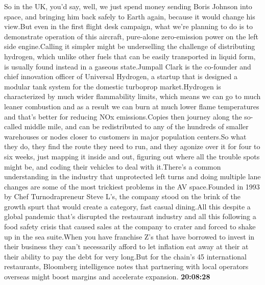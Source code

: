 \documentclass{article}%
\begin{document}
So in the UK, you'd say, well, we just spend money sending Boris Johnson into space, and bringing him back safely to Earth again, because it would change his view.But even in the first flight desk campaign, what we're planning to do is to demonstrate operation of this aircraft, pure{-}alone zero{-}emission power on the left side engine.Calling it simpler might be underselling the challenge of distributing hydrogen, which unlike other fuels that can be easily transported in liquid form, is usually found instead in a gaseous state.Jumpall Clark is the co{-}founder and chief innovation officer of Universal Hydrogen, a startup that is designed a modular tank system for the domestic turboprop market.Hydrogen is characterized by much wider flammability limits, which means we can go to much leaner combustion and as a result we can burn at much lower flame temperatures and that's better for reducing NOx emissions.Copies then journey along the so{-}called middle mile, and can be redistributed to any of the hundreds of smaller warehouses or nodes closer to customers in major population centers.So what they do, they find the route they need to run, and they agonize over it for four to six weeks, just mapping it inside and out, figuring out where all the trouble spots might be, and coding their vehicles to deal with it.There's a common understanding in the industry that unprotected left turns and doing multiple lane changes are some of the most trickiest problems in the AV space.Founded in 1993 by Chef Turnodrapreneur Steve L's, the company stood on the brink of the growth spurt that would create a category, fast casual dining.All this despite a global pandemic that's disrupted the restaurant industry and all this following a food safety crisis that caused sales at the company to crater and forced to shake up in the sea suite.When you have franchise Z's that have borrowed to invest in their business they can't necessarily afford to let inflation eat away at their at their ability to pay the debt for very long.But for the chain's 45 international restaurants, Bloomberg intelligence notes that partnering with local operators overseas might boost margins and accelerate expansion.%
\textbf{20:08:28}%
\newline%
\end{document}
